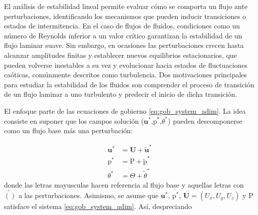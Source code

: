 El análisis de estabilidad lineal permite evaluar cómo se comporta un flujo ante perturbaciones, identificando los mecanismos que pueden inducir transiciones o estados de intermitencia. En el caso de flujos de fluidos, condiciones como un número de Reynolds inferior a un valor crítico garantizan la estabilidad de un flujo laminar suave. Sin embargo, en ocasiones las perturbaciones crecen hasta alcanzar amplitudes finitas y establecer nuevos equilibrios estacionarios, que pueden volverse inestables a su vez y evolucionar hacia estados de fluctuaciones caóticas, comúnmente descritos como turbulencia. Dos motivaciones principales para estudiar la estabilidad de los fluidos son comprender el proceso de transición de un flujo laminar a uno turbulento y predecir el inicio de dicha transición.

El enfoque parte de las ecuaciones de gobierno \ref{eq:gob_system_adim}. La idea consiste en suponer que los campos solución ($\mathbf{u^*}$,$\text{p}^*$,$\theta^*$) pueden descomponerse como un flujo base más una perturbación:

\begin{align}
\mathbf{u^*} &= \mathbf{U} + \tilde{\mathbf{u}}^* \\
\text{p}^* &= \text{P}+ \tilde{\text{p}}^* \\
\theta^* &= \Theta + \tilde{\theta}^*
\end{align}  
donde las letras mayusculas hacen referencia al flujo base y aquellas letras con $\tilde{()}$ a las perturbaciones. Asimismo, se asume que $\mathbf{u^*}$, $\text{p}^*$, $\mathbf{U} = (U_x,U_y,U_z)$ y $\text{P}$ satisface el sistema \ref{eq:gob_system_adim}. Así, despreciando

\\
